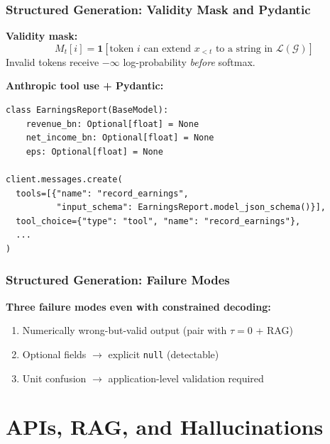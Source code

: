 \documentclass[9pt,t]{beamer}
\begin{document}
\begin{frame}[fragile]
\frametitle{Structured Generation: Validity Mask and Pydantic}

\textbf{Validity mask:}
\[
M_t[i] = \mathbf{1}\!\left[\text{token } i \text{ can extend } x_{<t}
\text{ to a string in } \mathcal{L}(\mathcal{G})\right]
\]
Invalid tokens receive $-\infty$ log-probability \emph{before} softmax.

\medskip
\textbf{Anthropic tool use + Pydantic:}

\begin{verbatim}
class EarningsReport(BaseModel):
    revenue_bn: Optional[float] = None
    net_income_bn: Optional[float] = None
    eps: Optional[float] = None

client.messages.create(
  tools=[{"name": "record_earnings",
          "input_schema": EarningsReport.model_json_schema()}],
  tool_choice={"type": "tool", "name": "record_earnings"},
  ...
)
\end{verbatim}
\end{frame}

\begin{frame}[fragile]
\frametitle{Structured Generation: Failure Modes}

\textbf{Three failure modes even with constrained decoding:}
\begin{enumerate}
  \item Numerically wrong-but-valid output (pair with $\tau=0$ + RAG)
  \item Optional fields $\to$ explicit \texttt{null} (detectable)
  \item Unit confusion $\to$ application-level validation required
\end{enumerate}
\end{frame}

\section{APIs, RAG, and Hallucinations}
\end{document}
